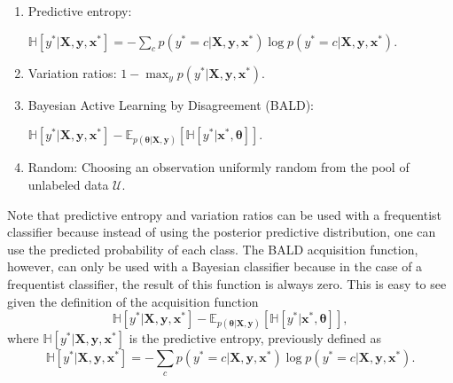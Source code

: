 \begin{enumerate}
  \item Predictive entropy:

  $\mathbb{H} \left[ y^* | \boldsymbol{X}, \boldsymbol{y}, \boldsymbol{x}^* \right] = - \sum_c p(y^* = c | \boldsymbol{X}, \boldsymbol{y}, \boldsymbol{x}^*) \log p(y^* = c | \boldsymbol{X}, \boldsymbol{y}, \boldsymbol{x}^*)$.

  \item Variation ratios: $1 - \max_y p(y^* | \boldsymbol{X}, \boldsymbol{y}, \boldsymbol{x}^*)$.

  \item Bayesian Active Learning by Disagreement (BALD):

  $\mathbb{H} \left[ y^* | \boldsymbol{X}, \boldsymbol{y}, \boldsymbol{x}^* \right] - \mathbb{E}_{p(\boldsymbol{\theta} | \boldsymbol{X}, \boldsymbol{y})} \left[ \mathbb{H} \left[ y^* | \boldsymbol{x}^*, \boldsymbol{\theta} \right] \right]$.

  \item Random: Choosing an observation uniformly random from the pool of unlabeled data $\mathcal{U}$.

\end{enumerate}

Note that predictive entropy and variation ratios can be used with a frequentist classifier because instead of using the posterior predictive distribution, one can use the predicted probability of each class. The BALD acquisition function, however, can only be used with a Bayesian classifier because in the case of a frequentist classifier, the result of this function is always zero. This is easy to see given the definition of the acquisition function
\begin{equation}
	\label{eq:bald_acq_func_def}
  \mathbb{H} \left[ y^* | \boldsymbol{X}, \boldsymbol{y}, \boldsymbol{x}^* \right] -
    \mathbb{E}_{p(\boldsymbol{\theta} | \boldsymbol{X}, \boldsymbol{y})} \left[ \mathbb{H} \left[ y^* | \boldsymbol{x}^*, \boldsymbol{\theta} \right] \right],
\end{equation}
where $\mathbb{H} \left[ y^* | \boldsymbol{X}, \boldsymbol{y}, \boldsymbol{x}^* \right]$ is the predictive entropy, previously defined as
\begin{equation}
	\label{eq:entropy_acq_func_def}
  \mathbb{H} \left[ y^* | \boldsymbol{X}, \boldsymbol{y}, \boldsymbol{x}^* \right] = - \sum_c p(y^* = c | \boldsymbol{X}, \boldsymbol{y}, \boldsymbol{x}^*) \log p(y^* = c | \boldsymbol{X}, \boldsymbol{y}, \boldsymbol{x}^*).
\end{equation}

